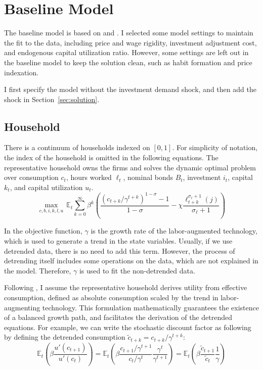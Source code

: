 \section{Baseline Model}\label{sec:model}
    The baseline model is based on \cite{herbstBayesianEstimationDSGE2015} and \cite{smetsShocksFrictionsUS2007}. I selected some model settings to maintain the fit to the data, including price and wage rigidity, investment adjustment cost, and endogenous capital utilization ratio. However, some settings are left out in the baseline model to keep the solution clean, such as habit formation and price indexation.

    I first specify the model without the investment demand shock, and then add the shock in Section~\ref{sec:solution}.

    \subsection{Household}
    There is a continuum of households indexed on $[0,1]$. For simplicity of notation, the index of the household is omitted in the following equations. The representative household owns the firms and solves the dynamic optimal problem over consumption $c_t$, hours worked $\ell_t$, nominal bonds $B_t$, investment $i_t$, capital $k_t$, and capital utilization $u_t$.
        \begin{equation}
            \max\limits_{c, b, i, k, l, u} \,\mathbb{E}_t \sum_{k=0}^{\infty} \beta^k \left(\frac{(c_{t+k} / \gamma^{t+k})^{1-\sigma} - 1}{1 - \sigma} - \chi\frac{\ell_{t+k}^{\sigma_\ell + 1}(j)}{\sigma_\ell + 1}\right)
        \end{equation}
    
    In the objective function, $\gamma$ is the growth rate of the labor-augmented technology, which is used to generate a trend in the state variables. Usually, if we use detrended data, there is no need to add this term. However, the process of detrending itself includes some operations on the data, which are not explained in the model. Therefore, $\gamma$ is used to fit the non-detrended data.

    Following \cite{herbstBayesianEstimationDSGE2015}, I assume the representative household derives utility from effective consumption, defined as absolute consumption scaled by the trend in labor-augmenting technology. This formulation mathematically guarantees the existence of a balanced growth path, and facilitates the derivation of the detrended equations. For example, we can write the stochastic discount factor as following by defining the detrended consumption $\tilde{c}_{t+k} = c_{t+k} / \gamma^{t+k}$:
    \[\mathbb{E}_t\left(\beta \frac{u'(c_{t+1})}{u'(c_t)}\right) 
    = \mathbb{E}_t\left(\beta \frac{c_{t+1}/\gamma^{t+1}}{c_t/\gamma^t}\frac{\gamma^t}{\gamma^{t+1}}\right) 
    = \mathbb{E}_t\left(\beta \frac{\tilde{c}_{t+1}}{\tilde{c}_{t}}\frac{1}{\gamma}\right)\]
    
